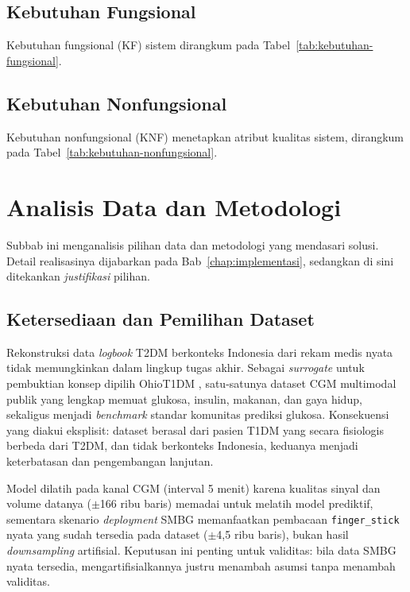\subsection{Kebutuhan Fungsional}
Kebutuhan fungsional (KF) sistem dirangkum pada Tabel~\ref{tab:kebutuhan-fungsional}.



\subsection{Kebutuhan Nonfungsional}
Kebutuhan nonfungsional (KNF) menetapkan atribut kualitas sistem, dirangkum pada Tabel~\ref{tab:kebutuhan-nonfungsional}.



\section{Analisis Data dan Metodologi}
Subbab ini menganalisis pilihan data dan metodologi yang mendasari solusi. Detail realisasinya dijabarkan pada Bab~\ref{chap:implementasi}, sedangkan di sini ditekankan \emph{justifikasi} pilihan.

\subsection{Ketersediaan dan Pemilihan Dataset}
Rekonstruksi data \emph{logbook} T2DM berkonteks Indonesia dari rekam medis nyata tidak memungkinkan dalam lingkup tugas akhir. Sebagai \emph{surrogate} untuk pembuktian konsep dipilih OhioT1DM \autocite{marling2020}, satu-satunya dataset CGM multimodal publik yang lengkap memuat glukosa, insulin, makanan, dan gaya hidup, sekaligus menjadi \emph{benchmark} standar komunitas prediksi glukosa. Konsekuensi yang diakui eksplisit: dataset berasal dari pasien T1DM yang secara fisiologis berbeda dari T2DM, dan tidak berkonteks Indonesia, keduanya menjadi keterbatasan dan pengembangan lanjutan.

Model dilatih pada kanal CGM (interval 5 menit) karena kualitas sinyal dan volume datanya ($\pm$166 ribu baris) memadai untuk melatih model prediktif, sementara skenario \emph{deployment} SMBG memanfaatkan pembacaan \texttt{finger\_stick} nyata yang sudah tersedia pada dataset ($\pm$4,5 ribu baris), bukan hasil \emph{downsampling} artifisial. Keputusan ini penting untuk validitas: bila data SMBG nyata tersedia, mengartifisialkannya justru menambah asumsi tanpa menambah validitas.

